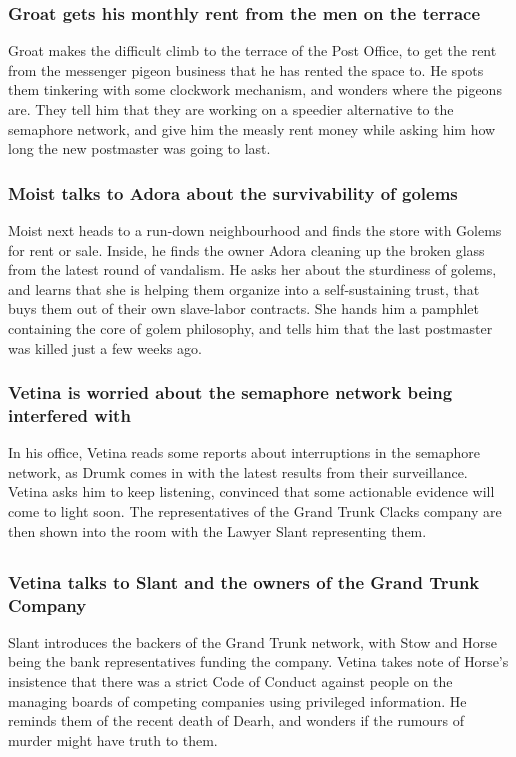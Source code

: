 \subsubsection{\Gls{Groat} gets his monthly rent from the men on the terrace}
\Gls{Groat} makes the difficult climb to the terrace of the Post Office, to get the rent from the
messenger pigeon business that he has rented the space to. He spots them tinkering with some
clockwork mechanism, and wonders where the pigeons are. They tell him that they are working on a
speedier alternative to the semaphore network, and give him the measly rent money while asking him
how long the new postmaster was going to last.

\subsubsection{\Gls{Moist} talks to \Gls{Adora} about the survivability of golems}
\Gls{Moist} next heads to a run-down neighbourhood and finds the store with Golems for rent or sale.
Inside, he finds the owner \Gls{Adora} cleaning up the broken glass from the latest round of
vandalism. He asks her about the sturdiness of golems, and learns that she is helping them organize
into a self-sustaining trust, that buys them out of their own slave-labor contracts. She hands him
a pamphlet containing the core of golem philosophy, and tells him that the last postmaster was
killed just a few weeks ago.

\subsubsection{\Gls{Vetina} is worried about the semaphore network being interfered with}
In his office, \Gls{Vetina} reads some reports about interruptions in the semaphore network, as
\Gls{Drumk} comes in with the latest results from their surveillance. \Gls{Vetina} asks him to keep
listening, convinced that some actionable evidence will come to light soon. The representatives of
the Grand Trunk Clacks company are then shown into the room with the Lawyer \Gls{Slant} representing
them.

\subsection{}
\subsubsection{\Gls{Vetina} talks to \Gls{Slant} and the owners of the Grand Trunk Company}
\Gls{Slant} introduces the backers of the Grand Trunk network, with \Gls{Stow} and \Gls{Horse} being
the bank representatives funding the company. \Gls{Vetina} takes note of \Gls{Horse}'s insistence
that there was a strict Code of Conduct against people on the managing boards of competing companies
using privileged information. He reminds them of the recent death of \Gls{Dearh}, and wonders if
the rumours of murder might have truth to them.

